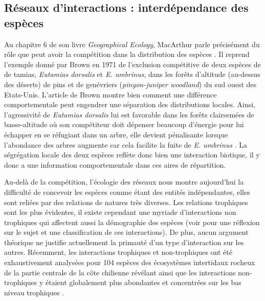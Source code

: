 \subsection*{Réseaux d'interactions : interdépendance des
espèces}\label{ruxe9seaux-dinteractions-interduxe9pendance-des-espuxe8ces}

Au chapitre 6 de son livre \emph{Geographical Ecology}, MacArthur parle
précisément du rôle que peut avoir la compétition dans la distribution
des espèces \citep{macarthur1972geographical}. Il reprend l'exemple
donné par Brown en 1971 de l'exclusion compétitive de deux espèces de de
tamias, \emph{Eutamias dorsalis} et \emph{E. umbrinus}, dans les forêts
d'altitude (au-dessus des déserts) de pins et de genévriers
(\emph{pinyon-juniper woodland}) du sud ouest des Etats-Unis. L'article
de Brown montre bien comment une différence comportementale peut
engendrer une séparation des distributions locales. Ainsi, l'agressivité
de \emph{Eutamias dorsalis} lui est favorable dans les forêts
clairsemées de basse-altitude où son compétiteur doit dépenser beaucoup
d'énergie pour lui échapper en se réfugiant dans un arbre, elle devient
pénalisante lorsque l'abondance des arbres augmente car cela facilite la
fuite de \emph{E. umbrinus} \citep{Brown1971}. La ségrégation locale des
deux espèces reflète donc bien une interaction biotique, il y donc a une
information comportementale dans ces aires de répartition.

Au-delà de la compétition, l'écologie des réseaux nous montre
aujourd'hui la difficulté de concevoir les espèces comme étant des
entités indépendantes, elles sont reliées par des relations de natures
très diverses. Les relations trophiques sont les plus évidentes, il
existe cependant une myriade d'interactions non trophiques qui affectent
aussi la démographie des espèces (voir \citet{Kefi2012} pour une
réflexion sur le sujet et une classification de ces interactions). De
plus, aucun argument théorique ne justifie actuellement la primauté d'un
type d'interaction sur les autres. Récemment, les interactions
trophiques et non-trophiques ont été exhaustivement analysées pour 104
espèces des écosystèmes intertidaux rocheux de la partie centrale de la
côte chilienne révélant ainsi que les interactions non-trophiques y
étaient globalement plus abondantes et concentrées sur les bas niveau
trophiques \citep{Kefi2015}.

